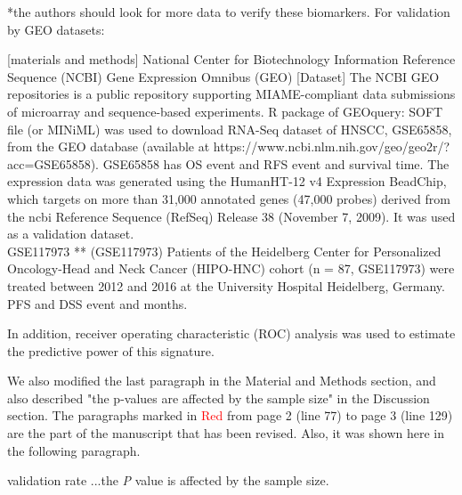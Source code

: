 \documentclass[preprint,12pt]{elsarticle}
\newenvironment{MyColorPar}[1]{%
    \leavevmode\color{#1}\ignorespaces%
}{%
}%
\begin{document}
\begin{MyColorPar}{blue}
*the authors should look for more data to verify these biomarkers.
For validation by GEO datasets:

[materials and methods]
National Center for Biotechnology Information Reference Sequence (NCBI) 
Gene Expression Omnibus (GEO)
[Dataset]
The NCBI GEO repositories is a public repository supporting MIAME-compliant data submissions of microarray and sequence-based experiments.
R package of GEOquery\cite{Sean2007}: SOFT file (or MINiML) was used to
download RNA-Seq dataset of HNSCC, GSE65858, from the GEO database (available at https://www.ncbi.nlm.nih.gov/geo/geo2r/?acc=GSE65858). 
GSE65858\cite{Wichmann2015} has OS event and RFS event and survival time.
The expression data was generated using the HumanHT-12 v4 Expression BeadChip, which targets on more than 31,000 annotated genes (47,000 probes) derived from the \acrfull{ncbi} Reference Sequence (RefSeq) Release 38 (November 7, 2009).
It was used as a validation dataset. \\

GSE117973
**  (GSE117973) Patients of the Heidelberg Center for Personalized Oncology-Head and Neck Cancer (HIPO-HNC) cohort (n = 87, GSE117973) were treated between 2012 and 2016 at the University Hospital Heidelberg, Germany.
PFS and DSS event and months.


In addition, receiver operating characteristic (ROC) analysis was used to estimate the predictive power of this signature\cite{Huang2019}.

We also modified the last paragraph in the Material and Methods section, and also described "the p-values are affected by the sample size" in the Discussion section.
The paragraphs marked in \textcolor{red}{Red} from page 2 (line 77) to page 3 (line 129) are the part of the manuscript that has been revised. Also, it was shown here in the following paragraph.
\\[0.3cm]

\begin{MyColorPar}{red}
validation rate
...the \textit{P} value is affected by the sample size. %

\end{MyColorPar} %


\end{MyColorPar} %
\end{document}
